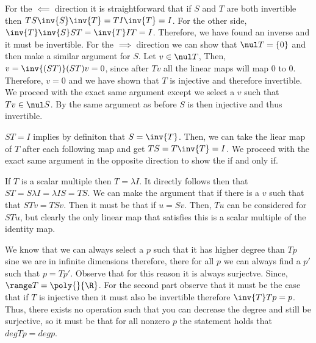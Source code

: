 \begin{q}[9]
    For the $ \impliedby $ direction it is straightforward that if $ S $ and $ T $ are both invertible then $ TS\inv{S}\inv{T} = TI\inv{T} = I$. 
    For the other side, $ \inv{T} \inv{S} S T = \inv{T} I T = I $. Therefore, we have found an inverse and it must be invertible.
    For the $ \implies $ direction we can show that $ \nul T = \{0\} $ and then make a similar argument for $ S $. 
    Let $ v \in \nul T $, 
    Then, $ v = \inv{(ST)} (ST)v = 0 $, since after $ Tv $ all the linear maps will map 0 to 0. Therefore,  $ v = 0 $ and we have shown that $ T $ is injective and therefore invertible.
    We proceed with the exact same argument except we select a $ v $ such that $ Tv \in \nul S $. 
    By the same argument as before $ S $ is then injective and thus invertible. 
\end{q}
\begin{q}[10]
    $ ST = I $ implies by definiton that $ S = \inv{T} $. Then, we can take the liear map of $ T $ after each following map and get $ TS = T \inv{T} = I $. 
    We proceed with the exact same argument in the opposite direction to show the if and only if.
\end{q}
\begin{q}[16]
    If $ T $ is a scalar multiple then $ T = \lambda I $. 
    It directly follows then that $ ST = S\lambda I = \lambda I S = TS $. 
    We can make the argument that if there is a $ v $ such that that $ STv = TSv $. Then it must be that if $ u = Sv $. Then, $Tu$ 
    can be considered for $ STu $, but clearly the only linear map that satisfies this is a scalar multiple of the identity map.
\end{q}
\begin{q}[19]
    We know that we can always select a $ p $ such that it has higher degree than $ Tp $ sine we are in infinite dimensions therefore, there for all $ p $ we can always find a $ p' $ such that $ p = Tp' $. 
    Observe that for this reason it is always surjectve. 
    Since, $ \range T = \poly{}{\R} $. 
    For the second part observe that it must be the case that if $ T $ is injective then it must also be invertible therefore $ \inv{T}T p = p $. 
    Thus, there exists no operation such that you can decrease the degree and still be surjective, so it must be that for all nonzero $ p $ 
    the statement holds that $ deg Tp = deg p $. 
\end{q}

